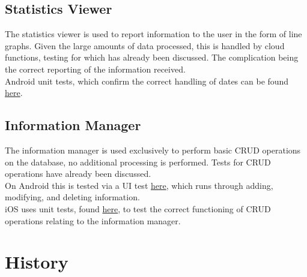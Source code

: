 \documentclass[12pt]{article}
\begin{document}
\subsection{Statistics Viewer}
The statistics viewer is used to report information to the user in the form of line graphs. Given the large amounts of data processed, this is handled by cloud functions, testing for which has already been discussed. The complication being the correct reporting of the information received.\\
\indent Android unit tests, which confirm the correct handling of dates can be found \href{https://github.com/BinaryNinjaz/COS301-Capstone/blob/Android/Source/master/Harvest/app/src/test/java/za/org/samac/harvest/StatsTests.java}{here}.
\subsection{Information Manager}
The information manager is used exclusively to perform basic CRUD operations on the database, no additional processing is performed. Tests for CRUD operations have already been discussed.\\
\indent On Android this is tested via a UI test \href{https://github.com/BinaryNinjaz/COS301-Capstone/blob/master/Source/Android/Harvest/app/src/androidTest/java/za/org/samac/harvest/InformationTest.java}{here}, which runs through adding, modifying, and deleting information.\\
\indent iOS uses unit tests, found \href{https://github.com/BinaryNinjaz/COS301-Capstone/blob/master/Source/iOS/Harvest/HarvestTests/GeoKitTests.swift}{here}, to test the correct functioning of CRUD operations relating to the information manager.

\section{History}
\end{document}
